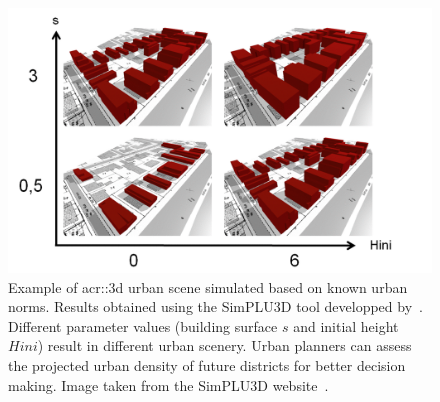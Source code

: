             \begin{figure}[htpb]
                \centering
                \includegraphics[width=\textwidth]{images/introduction/3d_model_applications/simplu}
                \caption[
                    Example of \acrshort*{acr::3d} urban scene simulated based on known urban norms.
                ]{
                    \label{fig::3d_simulation}
                    Example of \gls{acr::3d} urban scene simulated based on known urban norms.
                    Results obtained using the SimPLU3D tool developped by~\textcite{brasebin2017stochastic}.
                    Different parameter values (building surface \(s\) and initial height \(Hini\)) result in different urban scenery.
                    Urban planners can assess the projected urban density of future districts for better decision making.
                    Image taken from the SimPLU3D website~\parencite{brasebin2014simplu3d}.
                }
            \end{figure}
